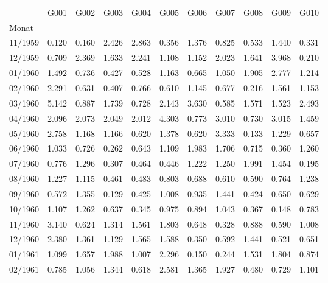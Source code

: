 \begin{tabular}{lrrrrrrrrrr}
\toprule
{} &   G001 &   G002 &   G003 &   G004 &   G005 &   G006 &   G007 &   G008 &   G009 &   G010 \\
Monat   &        &        &        &        &        &        &        &        &        &        \\
\midrule
11/1959 &  0.120 &  0.160 &  2.426 &  2.863 &  0.356 &  1.376 &  0.825 &  0.533 &  1.440 &  0.331 \\
12/1959 &  0.709 &  2.369 &  1.633 &  2.241 &  1.108 &  1.152 &  2.023 &  1.641 &  3.968 &  0.210 \\
01/1960 &  1.492 &  0.736 &  0.427 &  0.528 &  1.163 &  0.665 &  1.050 &  1.905 &  2.777 &  1.214 \\
02/1960 &  2.291 &  0.631 &  0.407 &  0.766 &  0.610 &  1.145 &  0.677 &  0.216 &  1.561 &  1.153 \\
03/1960 &  5.142 &  0.887 &  1.739 &  0.728 &  2.143 &  3.630 &  0.585 &  1.571 &  1.523 &  2.493 \\
04/1960 &  2.096 &  2.073 &  2.049 &  2.012 &  4.303 &  0.773 &  3.010 &  0.730 &  3.015 &  1.459 \\
05/1960 &  2.758 &  1.168 &  1.166 &  0.620 &  1.378 &  0.620 &  3.333 &  0.133 &  1.229 &  0.657 \\
06/1960 &  1.033 &  0.726 &  0.262 &  0.643 &  1.109 &  1.983 &  1.706 &  0.715 &  0.360 &  1.260 \\
07/1960 &  0.776 &  1.296 &  0.307 &  0.464 &  0.446 &  1.222 &  1.250 &  1.991 &  1.454 &  0.195 \\
08/1960 &  1.227 &  1.115 &  0.461 &  0.483 &  0.803 &  0.688 &  0.610 &  0.590 &  0.764 &  1.238 \\
09/1960 &  0.572 &  1.355 &  0.129 &  0.425 &  1.008 &  0.935 &  1.441 &  0.424 &  0.650 &  0.629 \\
10/1960 &  1.107 &  1.262 &  0.637 &  0.345 &  0.975 &  0.894 &  1.043 &  0.367 &  0.148 &  0.783 \\
11/1960 &  3.140 &  0.624 &  1.314 &  1.561 &  1.803 &  0.648 &  0.328 &  0.888 &  0.590 &  1.008 \\
12/1960 &  2.380 &  1.361 &  1.129 &  1.565 &  1.588 &  0.350 &  0.592 &  1.441 &  0.521 &  0.651 \\
01/1961 &  1.099 &  1.657 &  1.988 &  1.007 &  2.296 &  0.150 &  0.244 &  1.531 &  1.804 &  0.874 \\
02/1961 &  0.785 &  1.056 &  1.344 &  0.618 &  2.581 &  1.365 &  1.927 &  0.480 &  0.729 &  1.101 \\

\end{tabular}
